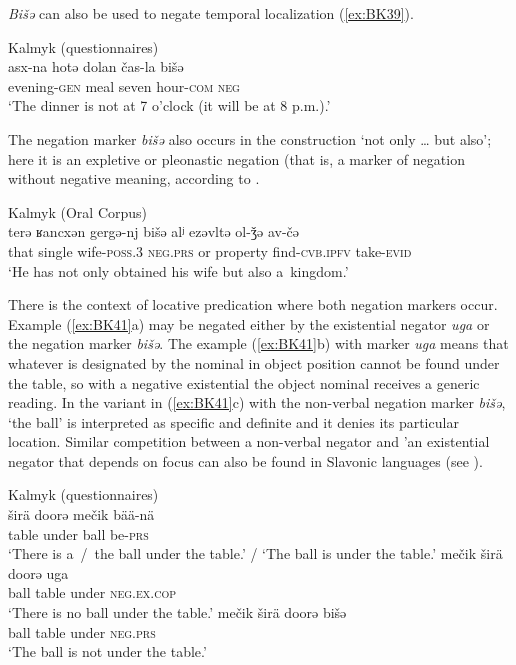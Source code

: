\documentclass[output=paper,draft,draftmode,colorlinks,citecolor=brown]{langscibook}
\begin{document}
\textit{Bišǝ} can also be used to negate temporal localization (\ref{ex:BK39}).

\ea Kalmyk (questionnaires) \label{ex:BK39}\\
	\gll asx-na			hotə	dolan		čas-la		bišǝ\\
	evening-\textsc{gen}	meal	seven		hour-\textsc{com}	\textsc{neg}\\
	\glt `The dinner is not at 7 o’clock (it will be at 8 p.m.).'
\z


The negation marker \textit{bišǝ} also occurs in the construction ‘not only … but also’; here it is an expletive or pleonastic negation (that is, a marker of negation without negative meaning, according to \citet[126]{Horn2010}.

\ea Kalmyk (Oral Corpus) \label{ex:BK40}\\
	\gll terǝ	ʁancxǝn		gergǝ-nj		bišǝ			alʲ		ezǝvltǝ	ol-ǯǝ				av-čǝ\\
	that	single		wife-\textsc{poss.3}		\textsc{neg.prs}		or		property	find-\textsc{cvb.ipfv}	take-\textsc{evid}\\
	\glt `He has not only obtained his wife but also a kingdom.'
\z


There is the context of locative predication where both negation markers occur. Example (\ref{ex:BK41}a) may be negated either by the existential negator \textit{uga} or the negation marker \textit{bišǝ}. The example (\ref{ex:BK41}b) with marker \textit{uga} means that whatever is designated by the nominal in object position cannot be found under the table, so with a negative existential the object nominal receives a generic reading. In the variant in (\ref{ex:BK41}c) with the non-verbal negation marker \textit{bišǝ}, ‘the ball’ is interpreted as specific and definite and it denies its particular location. Similar competition between a non-verbal negator and 'an existential negator that depends on focus can also be found in Slavonic languages (see \citealp[197]{Veselinova2010}).

\ea Kalmyk (questionnaires) \citep[14]{baranova2015a} \label{ex:BK41}\\
  \ea
	\gll širä	doorǝ		mečik		bää-nä\\
	table	under		ball		be-\textsc{prs}\\
	\glt `There is a / the ball under the table.’ / ‘The ball is under the table.'
  \ex
	\gll mečik		širä		doorǝ		uga\\
	ball		table		under		\textsc{neg.ex.cop}\\
	\glt `There is no ball under the table.'
  \ex
	\gll mečik		širä	doorǝ		bišǝ\\
	ball		table	under		\textsc{neg.prs}\\
	\glt `The ball is not under the table.'
\z \z
\end{document}
